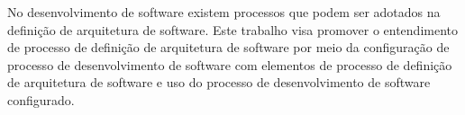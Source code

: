 No desenvolvimento de software existem processos que podem ser adotados na definição de arquitetura de software. Este trabalho visa promover o entendimento de processo de definição de arquitetura de software por meio da configuração de processo de desenvolvimento de software com elementos de processo de definição de arquitetura de software e uso do processo de desenvolvimento de software configurado.